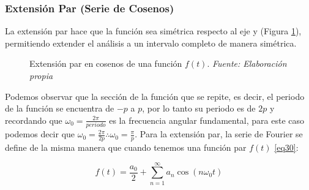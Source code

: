 \subsubsection{Extensión Par (Serie de Cosenos)}
La extensión par hace que la función sea simétrica respecto al eje y (Figura \ref{fig:serie-de-cosenos}), permitiendo extender el análisis a un intervalo completo de manera simétrica.
\begin{figure}[H]
		\caption[Extensión par en cosenos de una función $f(t)$]{Extensión par en cosenos de una función $f(t)$. \textit{Fuente: Elaboración propia}}
		\label{fig:serie-de-cosenos} 
\end{figure}
Podemos observar que la sección de la función que se repite, es decir, el periodo de la función se encuentra de $-p$ a $p$, por lo tanto su periodo es de $2p$ y recordando que  $\omega_0 = \frac{2\pi}{periodo}$ es la frecuencia angular fundamental, para este caso podemos decir que $\omega_0 = \frac{2\pi}{2p} \therefore \omega_0 = \frac{\pi}{p}$. \newpage
Para la extensión par, la serie de Fourier se define de la misma manera que cuando tenemos una función par $f(t)$ \eqref{eq30}:

\begin{equation}\label{eq32}
	f(t) = \frac{a_0}{2} + \sum_{n=1}^{\infty} a_n \cos(n\omega_0 t)
\end{equation}

